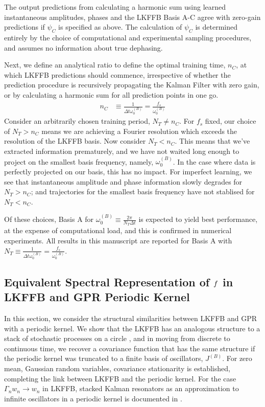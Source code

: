  The output predictions from calculating a harmonic sum using learned instantaneous amplitudes, phases and the LKFFB Basis A-C agree with zero-gain predictions if $\psi_C$ is specified as above. The calculation of $\psi_C$ is determined entirely by the choice of computational and experimental sampling procedures, and assumes no information about true dephasing.  
 
 Next, we define an analytical ratio to define the optimal training time, $n_C$, at which LKFFB predictions should commence, irrespective of whether the prediction procedure is recursively propagating the Kalman Filter with zero gain, or by calculating a harmonic sum for all prediction points in one go. 
 \begin{align}
 n_C &\equiv \frac{1}{\Delta t \omega_0^{(B)}} = \frac{f_s}{\omega_0^{(B)}} \label{eqn:sec:ap_liska_fixedbasis_nC}
 \end{align}
 Consider an arbitrarily chosen training period, $N_T \neq n_C $.  For $f_s$ fixed, our choice of $N_T > n_C $ means we are achieving a Fourier resolution which exceeds the resolution of the LKFFB basis. Now consider $N_T< n_C$. This means that we've extracted information prematurely, and we have not waited long enough to project on the smallest basis frequency, namely, $\omega_0^{(B)}$.  In the case where data is perfectly projected on our basis, this has no impact. For imperfect learning, we see that instantaneous amplitude and phase information slowly degrades for $N_T > n_C$; and trajectories for the smallest basis frequency have not stablised for $N_T < n_C$. 
 
 Of these choices, Basis A for $\omega_0^{(B)} \equiv \frac{2\pi}{N_T \Delta t}$ is expected to yield best performance, at the expense of computational load, and this is confirmed in numerical experiments. All results in this manuscript are reported for Basis A with $N_T \equiv \frac{1}{\Delta t \omega_0^{(B)}} = \frac{f_s}{\omega_0^{(B)}} $.

\subsection{Equivalent Spectral Representation of $f$ in LKFFB and GPR Periodic Kernel}

In this section, we consider the structural similarities between LKFFB and GPR with a periodic kernel. We show that the LKFFB has an analogous structure to a stack of stochastic processes on a circle \cite{karlin1975first}, and in moving from discrete to continuous time, we recover a covariance function that has the same structure if the periodic kernel was truncated to a finite basis of oscillators, $J^{(B)}$. For zero mean, Gaussian random variables, covariance stationarity is established, completing the link between LKFFB and the periodic kernel. For the case $\Gamma_n w_n \to w_n$ in LKFFB,  stacked Kalman resonators as an approximation to infinite oscillators in a periodic kernel is documented in \cite{solin2014explicit}.

